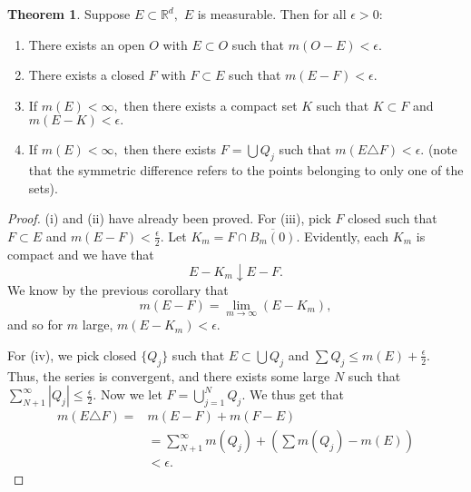 \documentclass[10pt, oneside]{article}
\newcommand{\bbR}{\mathbb{R}}
\theoremstyle{definition}
\newtheorem{thm}{Theorem}
\begin{document}
\begin{thm}
    Suppose $E \subset \bbR^d,$ $E$ is measurable. Then for all $\epsilon >0:$
    \begin{enumerate}
        \item There exists an open $O$ with $E \subset O$ such that $m(O - E)< \epsilon.$
        \item There exists a closed $F$ with $F\subset E$ such that $m(E - F)< \epsilon.$
        \item If $m(E) < \infty,$ then there exists a compact set $K$ such that 
        $K \subset F$ and $m(E - K)< \epsilon.$
        \item If $m(E) < \infty,$ then there exists $F = \bigcup Q_j$ such that 
        $m(E \triangle F) < \epsilon.$ (note that the symmetric difference refers to the points belonging to only one of the sets).
    \end{enumerate}
\end{thm}
\begin{proof}
    (i) and (ii) have already been proved. For (iii), pick $F$ closed such that $F\subset E$ and $m(E - F) < \frac{\epsilon}{2}.$ Let $K_m = F \cap \overline{B_m(0)}.$ Evidently, each $K_m$ is compact and we have that 
    \[E - K_m \downarrow E - F.\] We know by the previous corollary that 
    \[m(E - F) = \lim_{m\to \infty} (E - K_m),\] and so for $m$ large, $m(E - K_m)< \epsilon.$

    For (iv), we pick closed $\{Q_j\}$ such that $E \subset \bigcup Q_j$ and $\sum Q_j \leq m(E) + \frac{\epsilon}{2}.$ Thus, the series is convergent, and there exists some large $N$ such that $\sum_{N+1}^\infty |Q_j| \leq \frac{\epsilon}{2}.$ Now we let $F = \bigcup_{j=1}^N Q_j.$ We thus get that 
    \begin{align*}
        m(E \triangle F) = &m(E - F) +  m(F - E)\\
        &= \sum_{N+1}^\infty m(Q_j) + (\sum m(Q_j) - m(E))\\
        &< \epsilon.
    \end{align*}
\end{proof}

\newpage
\end{document}

